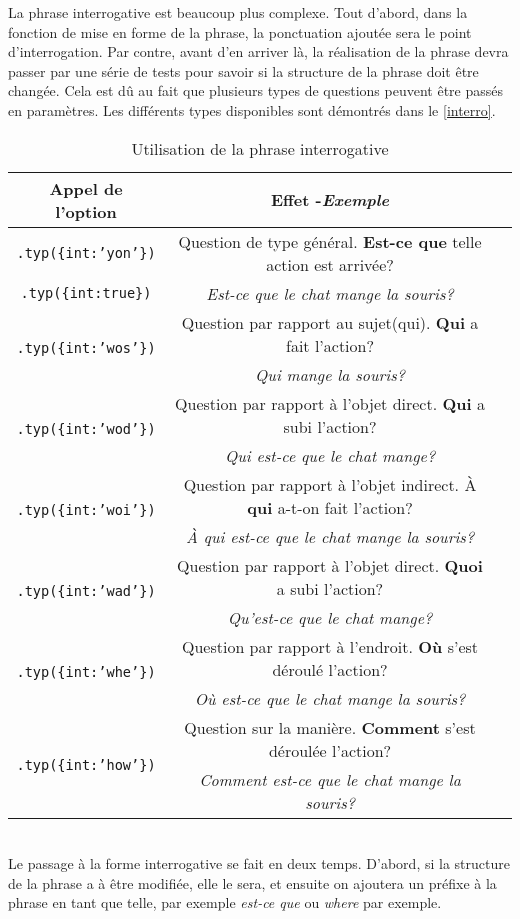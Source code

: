 \documentclass[11pt]{article} %
\newcommand{\real}[1]{\emph{#1}}
\begin{document}
La phrase interrogative est beaucoup plus complexe.
Tout d'abord, dans la fonction de mise en forme de la phrase, la
ponctuation ajoutée sera le point d'interrogation. Par contre, avant
d'en arriver là, la réalisation de la phrase devra passer par une
série de tests pour savoir si la structure de la phrase doit être
changée. Cela est dû au fait que plusieurs types de questions peuvent
être passés en paramètres. Les différents types disponibles sont démontrés 
dans le \autoref{interro}.
\begin{table}[h]
\caption{Utilisation de la phrase interrogative}
\begin{tabular}{|c|c|c|}
\hline 
Appel de l'option & Effet -\small{\real{Exemple}}\\
\hline 
\hline 
\texttt{.typ(\{int:'yon'\})} & Question de type général.\textbf{ Est-ce que} telle action est arrivée? \\
\texttt{.typ(\{int:true\})} & \small{\real{Est-ce que le chat mange la souris?}}\\
\hline
\multirow{2}{*}{\texttt{.typ(\{int:'wos'\})}} & Question par rapport au sujet(qui). \textbf{Qui} a fait l'action?\\
& \small{\real{Qui mange la souris?}}\\ \hline
\multirow{2}{*}{\texttt{.typ(\{int:'wod'\})}} & Question par rapport à l'objet direct. \textbf{Qui} a subi l'action?\\
& \small{\real{Qui est-ce que le chat mange?}}\\
\hline 
\multirow{2}{*}{\texttt{.typ(\{int:'woi'\})}} & Question par rapport à l'objet indirect. À \textbf{qui} a-t-on fait
l'action?\\
&\small{\real{À qui est-ce que le chat mange la souris?}}\\
\hline 
\multirow{2}{*}{\texttt{.typ(\{int:'wad'\})}} & Question par rapport à l'objet direct. \textbf{Quoi} a subi l'action?\\
&\small{\real{Qu'est-ce que le chat mange?}} \\ \hline 
\multirow{2}{*}{\texttt{.typ(\{int:'whe'\})}} & Question par rapport à l'endroit. \textbf{Où }s'est déroulé l'action?\\
& \small{\real{Où est-ce que le chat mange la souris?}} \\ \hline 
\multirow{2}{*}{\texttt{.typ(\{int:'how'\})}} & Question sur la manière. \textbf{Comment }s'est déroulée l'action?\\
& \small{\real{Comment est-ce que le chat mange la souris?}} \\ \hline 
\end{tabular}
\label{interro}
\end{table}
\\
Le passage à la forme interrogative se fait en deux temps. D'abord,
si la structure de la phrase a à être modifiée, elle le sera, et ensuite
on ajoutera un préfixe à la phrase en tant que telle, par exemple
\emph{est-ce que }ou \emph{where} par exemple.
\end{document}
